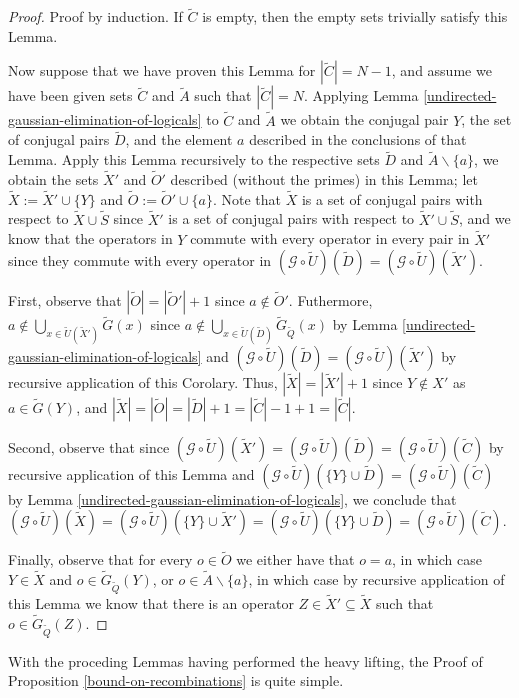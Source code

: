 \documentclass[twocolumn,showpacs,preprintnumbers,amsmath,amssymb,nofootinbib,pra,floatfix]{revtex4-1}
\newenvironment{remark}[1][Remark]{\begin{trivlist}
\item[\hskip \labelsep {\bfseries #1}]}{\end{trivlist}}
\newcommand{\set}{\tilde}
\newcommand{\genfun}{\mathcal{G}}
\begin{document}
\begin{proof}
Proof by induction.  If $\set C$ is empty, then the empty sets trivially satisfy this Lemma.

Now suppose that we have proven this Lemma for $|\set C|=N-1$, and assume we have been given sets $\set C$ and $\set A$ such that $|\set C|=N$.  Applying Lemma \ref{undirected-gaussian-elimination-of-logicals} to $\set C$ and $\set A$ we obtain the conjugal pair $Y$,  the set of conjugal pairs $\set D$, and the element $a$ described in the conclusions of that Lemma.  Apply this Lemma recursively to the respective sets $\set D$ and $\set A\backslash\{a\}$, we obtain the sets $\set X'$ and $\set O'$ described (without the primes) in this Lemma; let $\set X := \set X'\cup\{Y\}$ and $\set O:=\set O'\cup\{a\}$.  Note that $\set X$ is a set of conjugal pairs with respect to $\set X\cup\set S$ since $\set X'$ is a set of conjugal pairs with respect to $\set X'\cup\set S$, and we know that the operators in $Y$ commute with every operator in every pair in $\set X'$ since they commute with every operator in $(\genfun\circ\set U)(\set D)=(\genfun\circ\set U)(\set X')$.

First, observe that $|\set O|=|\set O'|+1$ since $a\notin \set O'$.  Futhermore, $a\notin \bigcup_{x\in \set U(\set X')} \set G(x)$ since $a\notin \bigcup_{x\in \set U(\set D)} \set G_{\set Q}(x)$ by Lemma \ref{undirected-gaussian-elimination-of-logicals} and $(\genfun\circ\set U)(\set D)=(\genfun\circ\set U)(\set X')$ by recursive application of this Corolary.  Thus, $|\set X|=|\set X'|+1$ since $Y\notin X'$ as $a\in\set G(Y)$, and $|\set X|=|\set O|=|\set D|+1=|\set C|-1+1=|\set C|$.

Second, observe that since $(\genfun\circ\set U)(\set X')=(\genfun\circ\set U)(\set D)=(\genfun\circ\set U)(\set C)$ by recursive application of this Lemma and $(\genfun\circ\set U)(\{Y\}\cup\set D)=(\genfun\circ\set U)(\set C)$ by Lemma \ref{undirected-gaussian-elimination-of-logicals}, we conclude that $(\genfun\circ\set U)(\set X) = (\genfun\circ\set U)(\{Y\}\cup\set X') = (\genfun\circ\set U)(\{Y\}\cup\set D) = (\genfun\circ\set U)(\set C)$.

Finally, observe that for every $o\in\set O$ we either have that $o=a$, in which case $Y\in\set X$ and $o\in\set G_{\set Q}(Y)$, or $o\in \set A\backslash\{a\}$, in which case by recursive application of this Lemma we know that there is an operator $Z\in \set X'\subseteq \set X$ such that $o\in\set G_{\set Q}(Z)$.
\end{proof}
\begin{remark}
With the proceding Lemmas having performed the heavy lifting, the Proof of Proposition \ref{bound-on-recombinations} is quite simple.
\end{remark}
\end{document}
